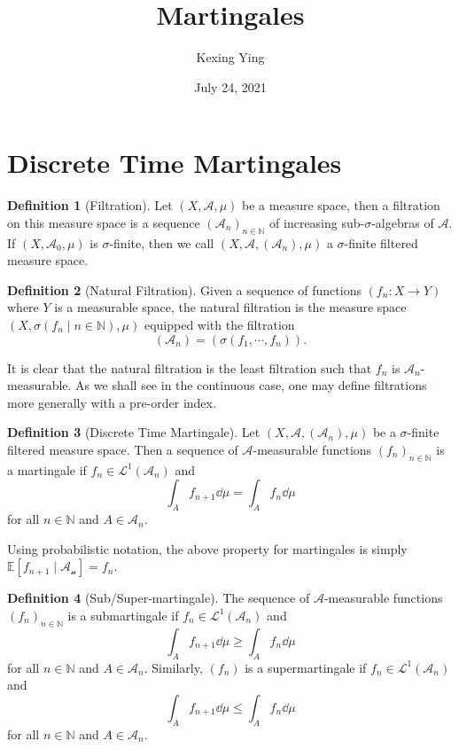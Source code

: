 \documentclass[]{article}
\title{Martingales}
\author{Kexing Ying}
\date{July 24, 2021}
\theoremstyle{definition}
\theoremstyle{definition}
\newtheorem{definition}{Definition}[section]
\begin{document}
\maketitle

{
\hypersetup{linkcolor=}
\setcounter{tocdepth}{2}
\tableofcontents
}
\newpage

\section{Discrete Time Martingales}

\begin{definition}[Filtration]
  Let \((X, \mathcal{A}, \mu)\) be a measure space, then a filtration on this 
  measure space is a sequence \((\mathcal{A}_n)_{n \in \mathbb{N}}\) of 
  increasing sub-\(\sigma\)-algebras of \(\mathcal{A}\). If 
  \((X, \mathcal{A}_0, \mu)\) is \(\sigma\)-finite, then we call 
  \((X, \mathcal{A}, (\mathcal{A}_n), \mu)\) a \(\sigma\)-finite filtered 
  measure space.
\end{definition}

\begin{definition}[Natural Filtration]
  Given a sequence of functions \((f_n : X \to Y)\) where \(Y\) is a measurable 
  space, the natural filtration is the measure space 
  \((X, \sigma(f_n \mid n \in \mathbb{N}), \mu)\) equipped with the filtration
  \[(\mathcal{A}_n) = (\sigma(f_1, \cdots, f_n)).\]
\end{definition}

It is clear that the natural filtration is the least filtration such that \(f_n\) 
is \(\mathcal{A}_n\)-measurable. As we shall see in the continuous case, one 
may define filtrations more generally with a pre-order index. 

\begin{definition}[Discrete Time Martingale]
  Let \((X, \mathcal{A}, (\mathcal{A}_n), \mu)\) be a \(\sigma\)-finite filtered 
  measure space. Then a sequence of \(\mathcal{A}\)-measurable functions 
  \((f_n)_{n \in \mathbb{N}}\) is a martingale if 
  \(f_n \in \mathcal{L}^1(\mathcal{A}_n)\) and 
  \[\int_A f_{n + 1} \dd \mu = \int_A f_n \dd \mu\]
  for all \(n \in \mathbb{N}\) and \(A \in \mathcal{A}_n\).
\end{definition}

Using probabilistic notation, the above property for martingales is simply 
\(\mathbb{E}[f_{n + 1} \mid \mathcal{A_n}] = f_n\).

\begin{definition}[Sub/Super-martingale]
  The sequence of \(\mathcal{A}\)-measurable functions \((f_n)_{n \in \mathbb{N}}\) 
  is a submartingale if \(f_n \in \mathcal{L}^1(\mathcal{A}_n)\) and 
  \[\int_A f_{n + 1} \dd \mu \ge \int_A f_n \dd \mu\]
  for all \(n \in \mathbb{N}\) and \(A \in \mathcal{A}_n\). Similarly, \((f_n)\) 
  is a supermartingale if \(f_n \in \mathcal{L}^1(\mathcal{A}_n)\) and 
  \[\int_A f_{n + 1} \dd \mu \le \int_A f_n \dd \mu\]
  for all \(n \in \mathbb{N}\) and \(A \in \mathcal{A}_n\).
\end{definition}
\end{document}
